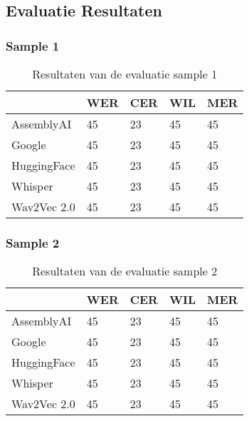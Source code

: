 \pagebreak

\subsection{Evaluatie Resultaten}
\subsubsection{Sample 1}
\begin{table}[htbp]
    \centering
    \caption{Resultaten van de evaluatie sample 1}
    \label{tab:results_sample1}
    \begin{tabularx}{\textwidth}{|l|X|X|X|X|}
        \hline
        & \textbf{WER} & \textbf{CER} & \textbf{WIL} & \textbf{MER} \\ \hline
        AssemblyAI & 45 & 23 & 45 & 45 \\ \hline
        Google & 45 & 23 & 45 & 45 \\ \hline
        HuggingFace & 45 & 23 & 45 & 45 \\ \hline
        Whisper & 45 & 23 & 45 & 45 \\ \hline
        Wav2Vec 2.0 & 45 & 23 & 45 & 45 \\ \hline
    \end{tabularx}
\end{table}
\FloatBarrier


\subsubsection{Sample 2}
\begin{table}[htbp]
    \centering
    \caption{Resultaten van de evaluatie sample 2}
    \label{tab:results_sample2}
    \begin{tabularx}{\textwidth}{|l|X|X|X|X|}
        \hline
        & \textbf{WER} & \textbf{CER} & \textbf{WIL} & \textbf{MER} \\ \hline
        AssemblyAI & 45 & 23 & 45 & 45 \\ \hline
        Google & 45 & 23 & 45 & 45 \\ \hline
        HuggingFace & 45 & 23 & 45 & 45 \\ \hline
        Whisper & 45 & 23 & 45 & 45 \\ \hline
        Wav2Vec 2.0 & 45 & 23 & 45 & 45 \\ \hline
    \end{tabularx}
\end{table}
\FloatBarrier


